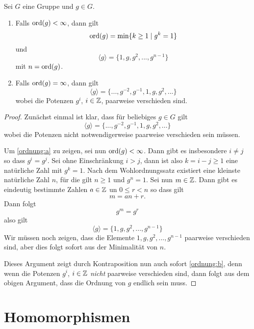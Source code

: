 \documentclass{book}
\begin{document}
\begin{prop}
    \label{prop:ordnung} Sei $G$ eine Gruppe und $g \in G$. 
    \begin{enumerate}
        \item\label{ordnung:a} Falls $\operatorname{ord}(g) < \infty$, dann gilt 
            \[
                \operatorname{ord}(g) = \min \{ k \geq 1 \; | \; g^k = 1 \}
            \]
            und 
            \[
                \langle g \rangle = \{ 1, g, g^2, ..., g^{n-1} \}
            \]
            mit $n = \operatorname{ord}(g)$. 
        \item\label{ordnung:b} Falls $\operatorname{ord}(g) = \infty$, dann gilt 
            \[
                \langle g \rangle = \{ ... , g^{-2}, g^{-1}, 1, g, g^2, ... \}
            \]
            wobei die Potenzen $g^i$, $i \in \mathbb{Z}$, paarweise verschieden sind. 
    \end{enumerate}
\end{prop}
\begin{proof}
    Zunächst einmal ist klar, dass für beliebiges $g \in G$ gilt
    \[
        \langle g \rangle = \{ ... , g^{-2}, g^{-1}, 1, g, g^2, ... \}
    \]
    wobei die Potenzen nicht notwendigerweise paarweise verschieden sein
    müssen. 

    Um \ref{ordnung:a} zu zeigen, sei nun $\operatorname{ord}(g) < \infty$. Dann gibt es
    insbesondere $i \neq j$ so dass $g^i = g^j$. Sei ohne Einschränkung $i >
    j$, dann ist also $k = i-j \geq 1$ eine natürliche Zahl mit $g^k = 1$. Nach
    dem Wohlordnungssatz existiert eine kleinste natürliche Zahl $n$, für die
    gilt $n \geq 1 $ und $g^n = 1$. Sei nun $m \in \mathbb{Z}$. Dann gibt es eindeutig bestimmte
    Zahlen $a \in \mathbb{Z}$ un $0 \leq r < n$ so dass gilt
    \[
        m = a n + r.
    \]
    Dann folgt
    \[
        g^m = g^r
    \]
    also gilt
    \[
          \langle g \rangle = \{ 1, g, g^2, ..., g^{n-1} \}
    \]
    Wir müssen noch zeigen, dass die Elemente $1, g, g^2, ..., g^{n-1}$
    paarweise verschieden sind, aber dies folgt sofort aus der Minimalität von
    $n$. 

    Dieses Argument zeigt durch Kontraposition nun auch sofort \ref{ordnung:b}, denn wenn
    die Potenzen $g^i$, $i \in \mathbb{Z}$ {\em nicht} paarweise verschieden sind, dann folgt
    aus dem obigen Argument, dass die Ordnung von $g$ endlich sein muss. 
\end{proof}


\section{Homomorphismen}%
\label{sec:homomorphismen}
\end{document}
